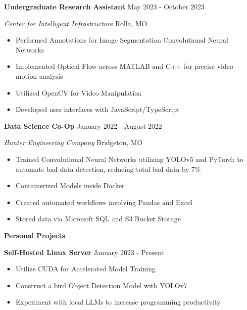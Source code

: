 \documentclass[11pt]{article}
\begin{document}
\textbf{Undergraduate Research Assistant} \hfill May 2023 - October 2023

\textsl{Center for Intelligent Infrastructure} \hfill Rolla, MO
\begin{itemize}[noitemsep, topsep=0pt, partopsep=0pt, parsep=0pt, itemsep=0pt]
    \item Performed Annotations for Image Segmentation Convolutional Neural Networks
    \item Implemented Optical Flow across MATLAB and C++ for precise video
    motion analysis
    \item Utilized OpenCV for Video Manipulation
    \item Developed user interfaces with JavaScript/TypeScript
\end{itemize}


\textbf{Data Science Co-Op} \hfill January 2022 - August 2022

\textsl{Hunter Engineering Company} \hfill Bridgeton, MO
\begin{itemize}[noitemsep, topsep=0pt, partopsep=0pt, parsep=0pt, itemsep=0pt]
    \item Trained Convolutional Neural Networks utilizing YOLOv5 and PyTorch
    to \\ automate bad data detection, reducing total bad data by 7\%
    \item Containerized Models inside Docker
    \item Created automated workflows involving Pandas and Excel
    \item Stored data via Microsoft SQL and S3 Bucket Storage
\end{itemize}


\begin{center}
    \textbf{Personal Projects}
\end{center}

\textbf{Self-Hosted Linux Server} \hfill January 2023 - Present
\begin{itemize}[noitemsep, topsep=0pt, partopsep=0pt, parsep=0pt, itemsep=0pt]
    \item Utilize CUDA for Accelerated Model Training
    \item Construct a bird Object Detection Model with YOLOv7
    \item Experiment with local LLMs to increase programming productivity
\end{itemize}
\end{document}
